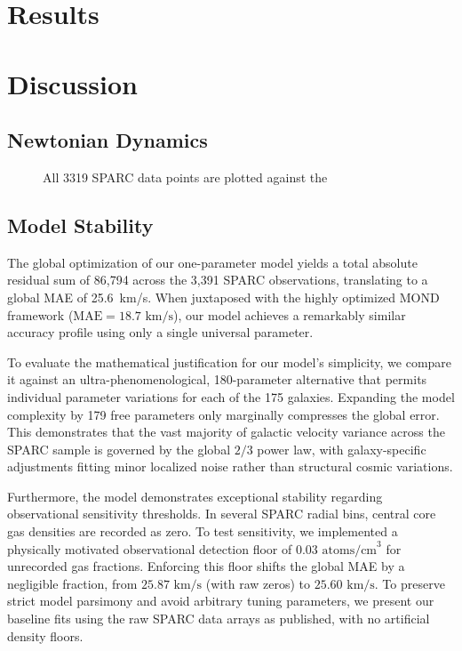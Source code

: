 \documentclass[twocolumn]{aastex631}
\begin{document}
\section{Results} \label{sec:results}


\section{Discussion} \label{sec:discussion}
\subsection{Newtonian Dynamics}
\begin{figure}[ht!]
\centering
\label{fig:newton}
\begin{center}
\end{center}
\caption{All 3319 SPARC data points are plotted against the }
\end{figure}


\subsection{Model Stability}
The global optimization of our one-parameter model yields a total absolute residual sum of 86,794 across the 3,391 SPARC observations, translating to a global MAE of 25.6~km/s. When juxtaposed with the highly optimized MOND framework ($\text{MAE} = 18.7\text{ km/s}$), our model achieves a remarkably similar accuracy profile using only a single universal parameter. 

To evaluate the mathematical justification for our model's simplicity, we compare it against an ultra-phenomenological, 180-parameter alternative that permits individual parameter variations for each of the 175 galaxies. Expanding the model complexity by 179 free parameters only marginally compresses the global error. This demonstrates that the vast majority of galactic velocity variance across the SPARC sample is governed by the global $2/3$ power law, with galaxy-specific adjustments fitting minor localized noise rather than structural cosmic variations.

Furthermore, the model demonstrates exceptional stability regarding observational sensitivity thresholds. In several SPARC radial bins, central core gas densities are recorded as zero. To test sensitivity, we implemented a physically motivated observational detection floor of $0.03\text{ atoms/cm}^3$ for unrecorded gas fractions. Enforcing this floor shifts the global MAE by a negligible fraction, from $25.87\text{ km/s}$ (with raw zeros) to $25.60\text{ km/s}$. To preserve strict model parsimony and avoid arbitrary tuning parameters, we present our baseline fits using the raw SPARC data arrays as published, with no artificial density floors.
\end{document}
